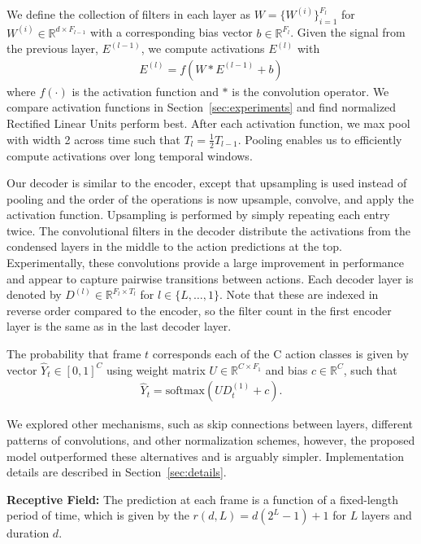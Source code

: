 \documentclass[10pt,twocolumn,letterpaper]{article}
\newcommand{\fakesubsection}[1]{\smallskip\noindent\textbf{#1:}}
\begin{document}
We define the collection of filters in each layer as $W=\{W^{(i)}\}_{i=1}^{F_l}$ for $W^{(i)} \in \mathbb{R}^{d \times F_{l-1}}$ with a corresponding bias vector
$b  \in \mathbb{R}^{F_l}$. 
Given the signal from the previous layer, $E^{(l-1)}$, we compute activations $E^{(l)}$ with
\begin{align}\label{eqn:ED-TCN}
E^{(l)} = f(W \ast E^{(l-1)} + b)
\end{align}
where $f(\cdot)$ is the activation function and  $\ast$ is the convolution operator. We compare activation functions in Section~\ref{sec:experiments} and find normalized Rectified Linear Units perform best.
After each activation function, we max pool with width 2 across time such that $T_l = \frac{1}{2} T_{l-1}$. 
Pooling enables us to efficiently compute activations over long temporal windows.


Our decoder is similar to the encoder, except that upsampling is used instead of pooling and the order of the operations is now upsample, convolve, and apply the activation function. 
Upsampling is performed by simply repeating each entry twice. The convolutional filters in the decoder distribute the activations from the condensed layers in the middle to the action predictions at the top.
Experimentally, these convolutions provide a large improvement in performance and appear to capture pairwise transitions between actions. 
Each decoder layer is denoted by 
$D^{(l)} \in \mathbb{R}^{F_{l} \times T_l}$
for $l \in \{L,\dots,1\}$. Note that these are indexed in reverse order compared to the encoder, so the filter count in the first encoder layer is the same as in the last decoder layer. 






The probability that frame $t$ corresponds each of the C action classes is given by vector $\hat Y_t \in [0,1]^C$ using weight matrix $U \in \mathbb{R}^{C \times F_1}$ and bias $c \in \mathbb{R}^{C}$, such that
\begin{align}
\hat{Y}_t = \text{softmax}(U D^{(1)}_t + c).
\end{align}


We explored other mechanisms, such as skip connections between layers, different patterns of convolutions, and other normalization schemes, however, the proposed model outperformed these alternatives and is arguably simpler. 
Implementation details are described in Section~\ref{sec:details}.

\fakesubsection{Receptive Field}
The prediction at each frame is a function of a fixed-length period of time, which is given by
the $r(d,L)=d(2^L-1) + 1$ for $L$ layers and duration $d$. 
\end{document}
